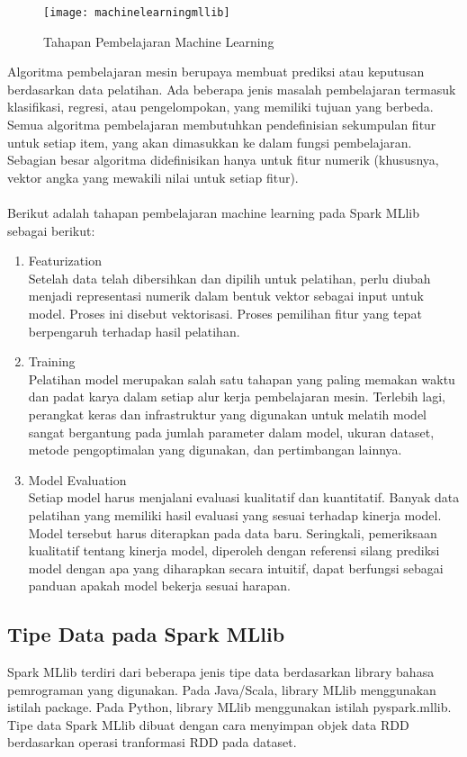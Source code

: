 \begin{figure}[H]
	\centering
	\texttt{[image: machinelearningmllib]}
	\caption{Tahapan Pembelajaran Machine Learning}
	\label{fig:machinelearningmllib}
\end{figure}
Algoritma pembelajaran mesin berupaya membuat prediksi atau keputusan berdasarkan data pelatihan. Ada beberapa jenis masalah pembelajaran termasuk klasifikasi, regresi, atau pengelompokan, yang memiliki tujuan yang berbeda. Semua algoritma pembelajaran membutuhkan pendefinisian sekumpulan fitur untuk setiap item, yang akan dimasukkan ke dalam fungsi pembelajaran. Sebagian besar algoritma didefinisikan hanya untuk fitur numerik (khususnya, vektor angka yang mewakili nilai untuk setiap fitur).
\\\\
\noindent Berikut adalah tahapan pembelajaran machine learning pada Spark MLlib sebagai berikut:

\begin{enumerate}

\item Featurization\\
Setelah data telah dibersihkan dan dipilih untuk pelatihan, perlu diubah menjadi representasi numerik dalam bentuk vektor sebagai input untuk model. Proses ini disebut vektorisasi. Proses pemilihan fitur yang tepat berpengaruh terhadap hasil pelatihan.
 
\item Training\\
Pelatihan model merupakan salah satu tahapan yang paling memakan waktu dan padat karya dalam setiap alur kerja pembelajaran mesin. Terlebih lagi, perangkat keras dan infrastruktur yang digunakan untuk melatih model sangat bergantung pada jumlah parameter dalam model, ukuran dataset, metode pengoptimalan yang digunakan, dan pertimbangan lainnya.

\item Model Evaluation\\
Setiap model harus menjalani evaluasi kualitatif dan kuantitatif. Banyak data pelatihan yang memiliki hasil evaluasi yang sesuai terhadap kinerja model. Model tersebut harus diterapkan pada data baru. Seringkali, pemeriksaan kualitatif tentang kinerja model, diperoleh dengan referensi silang prediksi model dengan apa yang diharapkan secara intuitif, dapat berfungsi sebagai panduan apakah model bekerja sesuai harapan.
\end{enumerate}

\subsection{Tipe Data pada Spark MLlib}
Spark MLlib terdiri dari beberapa jenis tipe data berdasarkan library bahasa pemrograman yang digunakan. Pada Java/Scala, library MLlib menggunakan istilah package. Pada Python, library MLlib menggunakan istilah pyspark.mllib. Tipe data Spark MLlib dibuat dengan cara menyimpan objek data RDD berdasarkan operasi tranformasi RDD pada dataset. \\\\

